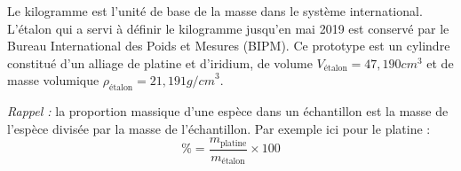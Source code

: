 Le kilogramme est l'unité de base de la masse dans le système international.
L'étalon qui a servi à définir le kilogramme jusqu'en mai 2019 est conservé par le Bureau International des Poids et Mesures (BIPM).
Ce prototype est un cylindre constitué d'un alliage de platine et d'iridium, de volume $V_\text{étalon} = 47,\!190 \unit{cm}^3$ et de masse volumique $\rho_\text{étalon} = 21,\!191 \unit{g/cm}^3$.



\textit{Rappel :} la proportion massique d'une espèce dans un échantillon est la masse de l'espèce divisée par la masse de l'échantillon. Par exemple ici pour le platine :
\begin{equation*}
  \% = \frac{m_\text{platine}}{m_\text{étalon}} \times 100
\end{equation*}

